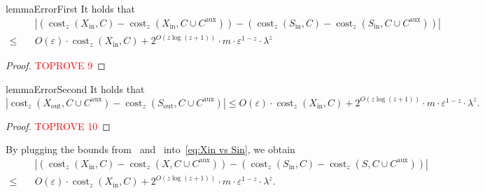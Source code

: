 \documentclass[letterpaper,11pt]{article}
\theoremstyle{plain}
\theoremstyle{definition}
\theoremstyle{remark}
\DeclareMathOperator{\cost}{cost}
\newcommand{\inl}{\mathrm{in}}
\newcommand{\out}{\mathrm{out}}
\newcommand{\eps}{\varepsilon}
\newcommand{\aux}{\mathrm{aux}}
\begin{document}
\begin{restatable}{lemma}{ErrorFirst}
    \label{lem:error first}
    It holds that 
    \begin{align*}
        &\quad \left|\left(\cost_z(X_\inl,C) - \cost_z(X_\inl,C\cup C^\aux) \right) - \left(\cost_z(S_\inl,C) - \cost_z(S_\inl,C\cup C^\aux) \right)  \right|\\
        \le&\quad O(\eps)\cdot \cost_z(X_\inl,C) + 2^{O(z\log (z+1))}\cdot m\cdot \eps^{1-z}\cdot \lambda^z
    \end{align*}
\end{restatable}
\begin{proof}\textcolor{red}{TOPROVE 9}\end{proof}


\begin{restatable}{lemma}{ErrorSecond}
    \label{lem:error second}
    It holds that 
    \begin{equation*}
        \left|\cost_z(X_\out,C\cup C^\aux) - \cost_z(S_\out,C\cup C^\aux) \right|\le O(\eps)\cdot \cost_z(X_\inl,C) + 2^{O(z\log(z+1))}\cdot m\cdot \eps^{1-z}\cdot \lambda^z.
    \end{equation*}
\end{restatable}
\begin{proof}\textcolor{red}{TOPROVE 10}\end{proof}

By plugging the bounds from~ and~ into~\eqref{eq:Xin vs Sin}, we obtain 
\begin{equation}
    \label{eq:key 2}
    \begin{aligned}    
    &\quad \left|\left(\cost_z(X_\inl,C) - \cost_z(X,C\cup C^\aux) \right) - \left(\cost_z(S_\inl,C) - \cost_z(S,C\cup C^\aux) \right) \right|\\
    \le&\quad O(\eps)\cdot \cost_z(X_\inl,C) + 2^{O(z\log (z+1))}\cdot m\cdot \eps^{1-z}\cdot \lambda^z.
    \end{aligned}
\end{equation}
\end{document}
